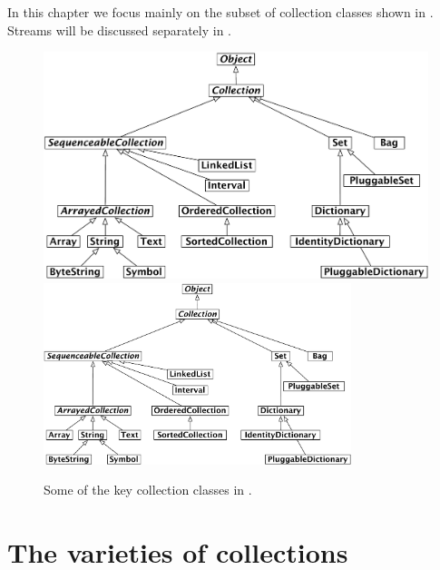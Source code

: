 \documentclass[a4paper,10pt,twoside]{book}
\begin{document}
In this chapter we focus mainly on the subset of collection classes shown in .
Streams will be discussed separately in .



\begin{figure}
\begin{center}
\ifluluelse
	{\includegraphics[width=\textwidth]{CollectionHierarchy}}
	{\includegraphics[width=0.8\textwidth]{CollectionHierarchy}}
\caption{Some of the key collection classes in \squeak.}
\label{fig:CollClassesTree}
\end{center}
\end{figure}

\section{The varieties of collections}
\label{sec:varieties}
\end{document}
